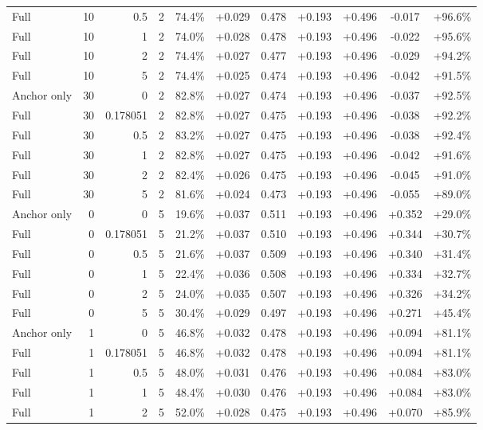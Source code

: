 \begin{table}[htbp]
\begin{tabular}{lrrrccccccc}
Full & 10 & 0.5 & 2 & 74.4\% & +0.029 & 0.478 & +0.193 & +0.496 & -0.017 & +96.6\% \\
Full & 10 & 1 & 2 & 74.0\% & +0.028 & 0.478 & +0.193 & +0.496 & -0.022 & +95.6\% \\
Full & 10 & 2 & 2 & 74.4\% & +0.027 & 0.477 & +0.193 & +0.496 & -0.029 & +94.2\% \\
Full & 10 & 5 & 2 & 74.4\% & +0.025 & 0.474 & +0.193 & +0.496 & -0.042 & +91.5\% \\
Anchor only & 30 & 0 & 2 & 82.8\% & +0.027 & 0.474 & +0.193 & +0.496 & -0.037 & +92.5\% \\
Full & 30 & 0.178051 & 2 & 82.8\% & +0.027 & 0.475 & +0.193 & +0.496 & -0.038 & +92.2\% \\
Full & 30 & 0.5 & 2 & 83.2\% & +0.027 & 0.475 & +0.193 & +0.496 & -0.038 & +92.4\% \\
Full & 30 & 1 & 2 & 82.8\% & +0.027 & 0.475 & +0.193 & +0.496 & -0.042 & +91.6\% \\
Full & 30 & 2 & 2 & 82.4\% & +0.026 & 0.475 & +0.193 & +0.496 & -0.045 & +91.0\% \\
Full & 30 & 5 & 2 & 81.6\% & +0.024 & 0.473 & +0.193 & +0.496 & -0.055 & +89.0\% \\
Anchor only & 0 & 0 & 5 & 19.6\% & +0.037 & 0.511 & +0.193 & +0.496 & +0.352 & +29.0\% \\
Full & 0 & 0.178051 & 5 & 21.2\% & +0.037 & 0.510 & +0.193 & +0.496 & +0.344 & +30.7\% \\
Full & 0 & 0.5 & 5 & 21.6\% & +0.037 & 0.509 & +0.193 & +0.496 & +0.340 & +31.4\% \\
Full & 0 & 1 & 5 & 22.4\% & +0.036 & 0.508 & +0.193 & +0.496 & +0.334 & +32.7\% \\
Full & 0 & 2 & 5 & 24.0\% & +0.035 & 0.507 & +0.193 & +0.496 & +0.326 & +34.2\% \\
Full & 0 & 5 & 5 & 30.4\% & +0.029 & 0.497 & +0.193 & +0.496 & +0.271 & +45.4\% \\
Anchor only & 1 & 0 & 5 & 46.8\% & +0.032 & 0.478 & +0.193 & +0.496 & +0.094 & +81.1\% \\
Full & 1 & 0.178051 & 5 & 46.8\% & +0.032 & 0.478 & +0.193 & +0.496 & +0.094 & +81.1\% \\
Full & 1 & 0.5 & 5 & 48.0\% & +0.031 & 0.476 & +0.193 & +0.496 & +0.084 & +83.0\% \\
Full & 1 & 1 & 5 & 48.4\% & +0.030 & 0.476 & +0.193 & +0.496 & +0.084 & +83.0\% \\
Full & 1 & 2 & 5 & 52.0\% & +0.028 & 0.475 & +0.193 & +0.496 & +0.070 & +85.9\% \\

\end{tabular}
\end{table}

